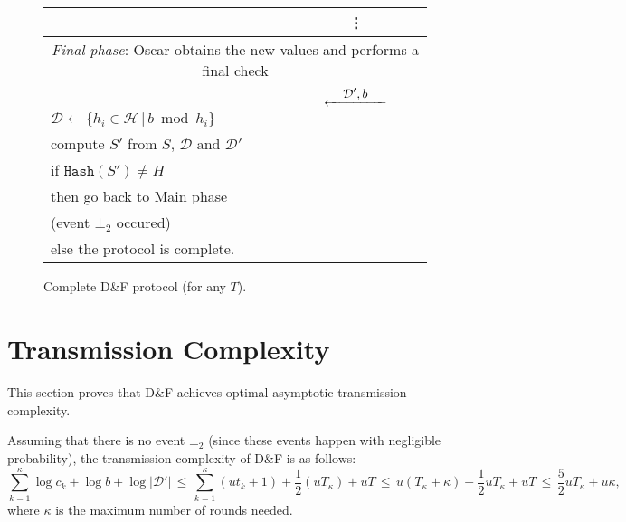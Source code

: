 \documentclass{llncs}
\newcommand{\Set}{\mathcal{H}}
\newcommand{\SetD}{\mathcal{D}}
\newcommand{\df}{D\&F\xspace}
\newcommand{\Hash}{\ensuremath{\mathtt{Hash}}}
\newcommand{\Lflow}[1]{\stackrel{\displaystyle #1}{\hbox to 5em{\leftarrowfill}}}
\begin{document}
\begin{figure}
\begin{tabular}{p{}cp{}}
 & \vdots & \\
\midrule
\multicolumn{3}{c}{\textit{Final phase}: Oscar obtains the new values and performs a final check } \\
\midrule
                                  & $\Lflow{\SetD',b}$     & \\
$\SetD \gets \{ h_i \in \Set \,|\, b \bmod h_i \}$ & & \\
compute $S'$ from $S$, $\SetD$ and $\SetD'$ & & \\
if $\Hash(S') \neq H$ & & \\
\hspace{0.2cm} then go back to Main phase && \\
\hspace{0.4cm} (event $\bot_2$ occured) & & \\
\hspace{0.2cm} else the protocol is complete. & & \\
\bottomrule
\end{tabular}\vspace{-0.25cm} %
\caption{Complete \df protocol (for any $T$).}
\label{fig:complete-df}
\end{figure}


\section{Transmission Complexity}
\label{sec:trans}

This section proves that \df achieves optimal asymptotic transmission complexity.


Assuming that there is no event $\bot_2$ (since these events happen with negligible probability), the transmission complexity of \df is as follows:
\[  \sum_{k=1}^\kappa \log c_k + \log b + \log |\SetD'|
 \,\leq\, \sum_{k=1}^\kappa (ut_k+1) + \frac{1}{2} (uT_\kappa) + u T
 \,\leq\, u (T_\kappa + \kappa) + \frac{1}{2} u T_\kappa + u T
 \,\leq\, \frac{5}{2} u T_\kappa + u \kappa, \]
where $\kappa$ is the maximum number of rounds needed.
\end{document}
